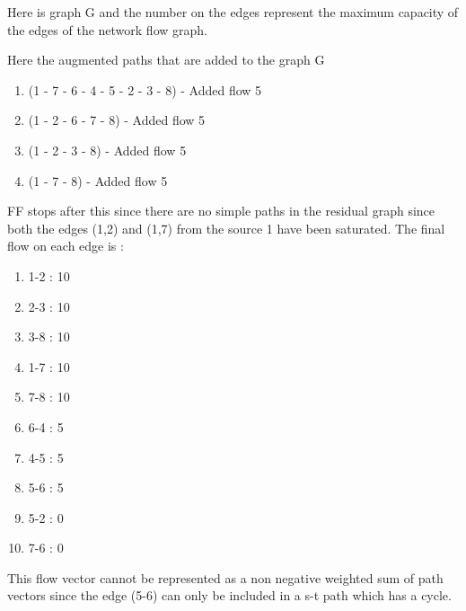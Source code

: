 \documentclass[12pt]{article}
\begin{document}
Here is graph G and the number on the edges represent the maximum capacity of the edges of the network flow graph.


Here the augmented paths that are added to the graph G 
\begin{enumerate}
\item (1 - 7 - 6 - 4 - 5 - 2 - 3 - 8) -  Added flow 5
\item (1 - 2 - 6 - 7 - 8) -  Added flow 5
\item (1 - 2 - 3 - 8) - Added flow 5
\item (1 - 7 - 8) - Added flow 5
\end{enumerate}
FF stops after this since there are no simple paths in the residual graph since both the edges (1,2) and (1,7) from the source 1 have been saturated.
The final flow on each edge is :
\begin{enumerate}
\item 1-2	: 10
\item 2-3	: 10
\item 3-8	: 10
\item 1-7	: 10
\item 7-8	: 10
\item 6-4	: 5
\item 4-5	: 5
\item 5-6	: 5
\item 5-2	: 0
\item 7-6	: 0
\end{enumerate}

This flow vector cannot be represented as a non negative weighted sum of path vectors since the edge (5-6) can only be included in a s-t path which has a cycle.
\end{document}
